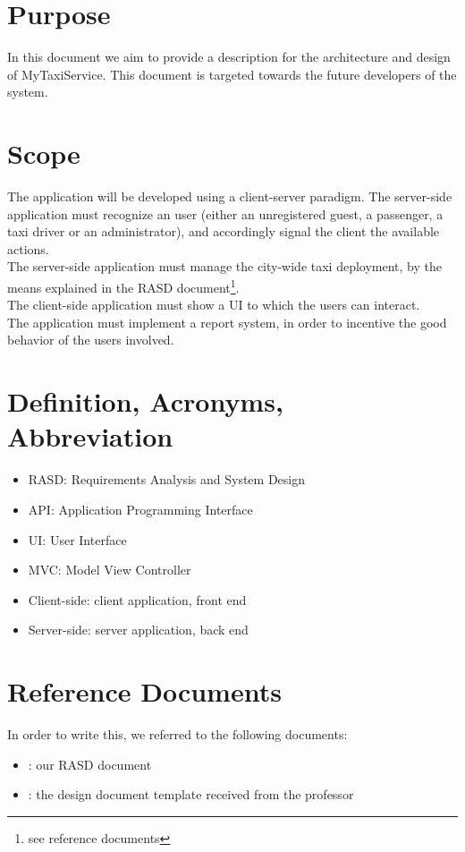 \section{Purpose}
In this document we aim to provide a description for the architecture and design of MyTaxiService.
This document is targeted towards the future developers of the system.

\section{Scope}
The application will be developed using a client-server paradigm.
The server-side application must recognize an user (either an unregistered guest, a passenger, a taxi driver or an administrator), 
and accordingly signal the client the available actions. \\
The server-side application must manage the city-wide taxi deployment, by the means explained in the RASD 
document\footnote{see reference documents}. \\ The client-side application must show a UI to which the users can interact. \\
The application must implement a report system, in order to incentive the good behavior of the users involved.

\section{Definition, Acronyms, Abbreviation}
\begin{itemize}
 \item RASD: Requirements Analysis and System Design
 \item API: Application Programming Interface
 \item UI: User Interface
 \item MVC: Model View Controller
 \item Client-side: client application, front end
 \item Server-side: server application, back end
\end{itemize}

\section{Reference Documents}
In order to write this, we referred to the following documents:
\begin{itemize}
 \item [1]: our RASD document
 \item [2]: the design document template received from the professor
\end{itemize}

